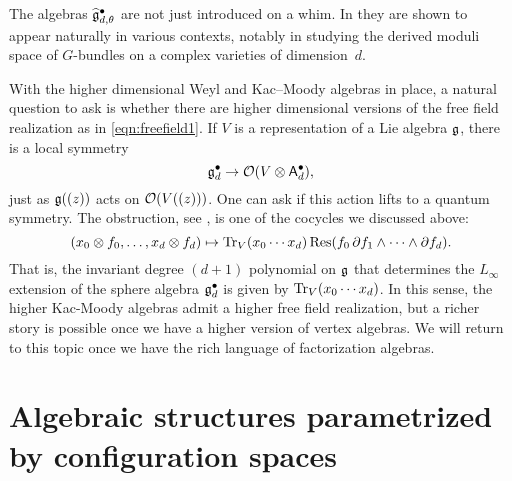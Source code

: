 \documentclass[11pt]{amsart}
\begin{document}
The algebras $\widehat{\mathfrak g}^\bullet_{d, \theta}$ are not just introduced on a whim.
In \cite{FHK} they are shown to appear naturally in various contexts,
notably in studying the derived moduli space of $G$-bundles on a complex varieties of dimension~$d$.

With the higher dimensional Weyl and Kac--Moody algebras in place, a natural question to ask is whether there are higher dimensional versions of the free field realization as in \eqref{eqn:freefield1}. 
If $V$ is a representation of a Lie algebra $\mathfrak g$,
there is a local symmetry 
\[
\mathfrak g^\bullet_d \to \mathcal O(V \otimes \mathsf A^{\bullet}_d),
\]
just as $\mathfrak g((z))$ acts on $\mathcal O(V((z)))$. 
One can ask if this action lifts to a quantum symmetry.
The obstruction, see \cite{GWkm}, is one of the cocycles we discussed above:
\[
(x_0 \otimes f_0, \ldots, x_{d} \otimes f_{d}) \mapsto {\rm Tr}_V( x_0 \cdots x_{d}) \,{\rm Res}(f_0 \, \partial f_1 \wedge \cdots \wedge \partial f_{d}).
\]
That is, the invariant degree $(d+1)$ polynomial on $\mathfrak g$ that determines the $L_\infty$ extension of the sphere algebra $\mathfrak g_d^\bullet$ is given by ${\rm Tr}_V (x_0 \cdots x_{d})$.
In this sense, the higher Kac-Moody algebras admit a higher free field realization,
but a richer story is possible once we have a higher version of vertex algebras.
We will return to this topic once we have the rich language of factorization algebras.

\section{Algebraic structures parametrized by configuration spaces}
\label{sec: config}
\end{document}
